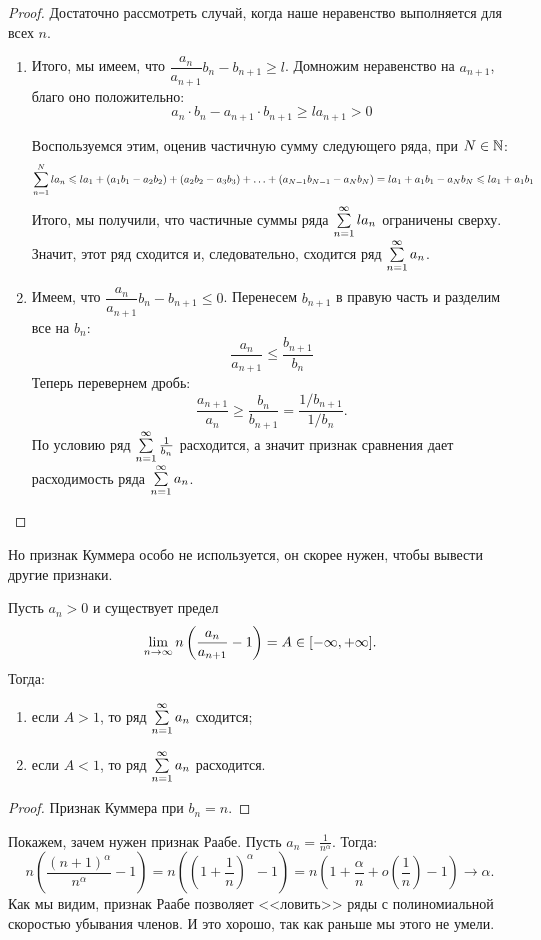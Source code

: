 \documentclass[a4paper, 12pt]{article}
\begin{document}
\begin{proof}
Достаточно рассмотреть случай, когда наше неравенство выполняется для всех $n$.
\begin{enumerate}
\item Итого, мы имеем, что $\dfrac{a_n}{a_{n+1}}b_n - b_{n+1} \geq l$. Домножим неравенство на $a_{n+1}$, благо оно положительно:
$$
a_n\cdot b_n - a_{n+1}\cdot b_{n+1} \geq la_{n+1} > 0
$$

Воспользуемся этим, оценив частичную сумму следующего ряда, при $N \in \mathbb{N}$:
$$
\sum\limits_{n=1}^{N} la_n \leqslant la_1 + (a_1b_1 - a_2b_2) + (a_2b_2 - a_3b_3) + \ldots + (a_{N-1}b_{N-1} - a_Nb_N)
= la_1 + a_1b_1 - a_Nb_N \leqslant la_1 + a_1b_1
$$
Итого, мы получили, что частичные суммы ряда $\sum\limits_{n=1}^{\infty} la_n$ ограничены сверху. Значит, этот ряд сходится и, следовательно, сходится ряд $\sum\limits_{n=1}^{\infty}a_n$.

\item Имеем, что $\dfrac{a_n}{a_{n+1}}b_n - b_{n+1} \leq 0$. Перенесем $b_{n+1}$ в правую часть и разделим все на $b_n$:
$$
\frac{a_n}{a_{n+1}} \leq \frac{b_{n+1}}{b_n}
$$
Теперь перевернем дробь:
$$
\frac{a_{n+1}}{a_n} \geq \frac{b_n}{b_{n+1}} = \frac{1/ b_{n+1}}{1 / b_{n}}.
$$
По условию ряд $\sum\limits_{n=1}^{\infty}\frac{1}{b_n}$ расходится, а значит признак сравнения дает расходимость ряда $\sum\limits_{n=1}^{\infty}a_n$.
\end{enumerate}
\end{proof}

Но признак Куммера особо не используется, он скорее нужен, чтобы вывести другие признаки.
\begin{Test}
Пусть $a_n > 0$ и существует предел 
$$
\lim\limits_{n \rightarrow \infty} n \left( \dfrac{a_n}{a_{n+1}} - 1 \right) = A \in [-\infty, +\infty].
$$
Тогда:
\begin{enumerate}
\item если $A > 1$, то ряд $\sum\limits_{n=1}^{\infty}a_n$ сходится;
\item если $A < 1$, то ряд $\sum\limits_{n=1}^{\infty}a_n$ расходится.
\end{enumerate}
\end{Test}

\begin{proof}
Признак Куммера при $b_n = n$.
\end{proof}

Покажем, зачем нужен признак Раабе. Пусть $a_n = \frac{1}{n^\alpha}$. Тогда:
$$
n\left( \frac{(n+1)^\alpha}{n^{\alpha}} - 1 \right) = n\left( \left( 1 + \frac{1}{n} \right)^\alpha  - 1\right) = n\left( 1 + \frac{\alpha}{n} + o\left(\frac{1}{n}\right) - 1\right) \longrightarrow \alpha.
$$
Как мы видим, признак Раабе позволяет <<ловить>> ряды с полиномиальной скоростью убывания членов. И это хорошо, так как раньше мы этого не умели.
\end{document}
